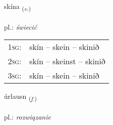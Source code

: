 \documentclass[frontgrid, backgrid]{flacards}\usepackage[]{graphicx}\usepackage[]{xcolor}
\begin{document}
\renewcommand{\flhead}{\vskip5pt \fboxsep=0pt {\small\bfseries\footnotesize Sagnorð | czasownik}}
\renewcommand{\fcfoot}{\vskip5pt \fboxsep=0pt \hspace{2pt}{\small\bfseries\footnotesize 3K}}

\renewcommand{\blhead}{\vskip5pt {\small\bfseries\footnotesize Sagnorð | czasownik }}
\renewcommand{\bcfoot}{\vskip5pt \hspace{2pt}{\small\bfseries\footnotesize 3K}}


{skína \small{\textsubscript{(\textit{v.})}} \\[1ex] %
\textphonetic{[sciːna]} \\
pl.: \emph{świecić} \\  [2ex]
\renewcommand*{\arraystretch}{0.8}
\begin{tabular}{p{1cm}l}
\textsc{1sg}: & skín -- skein -- skinið \\ 
\textsc{2sg}: & skín -- skeinst -- skinið \\ 
\textsc{3sg}: & skín -- skein -- skinið \\ 
\end{tabular}
}

\renewcommand{\flhead}{\vskip5pt \fboxsep=0pt {\small\bfseries\footnotesize Nafnorð | rzeczownik}}
\renewcommand{\fcfoot}{\vskip5pt \fboxsep=0pt \hspace{2pt}{\small\bfseries\footnotesize 3K}}

\renewcommand{\blhead}{\vskip5pt {\small\bfseries\footnotesize Nafnorð | rzeczownik }}
\renewcommand{\bcfoot}{\vskip5pt \hspace{2pt}{\small\bfseries\footnotesize 3K}}


{úrlausn \small{\textsubscript{(\textit{f.})}} \\[1ex] %
\textphonetic{[urlœistn̥]} \\
pl.: \emph{rozwiązanie} \\  [2ex]
\renewcommand*{\arraystretch}{0.8}
}
\end{document}

